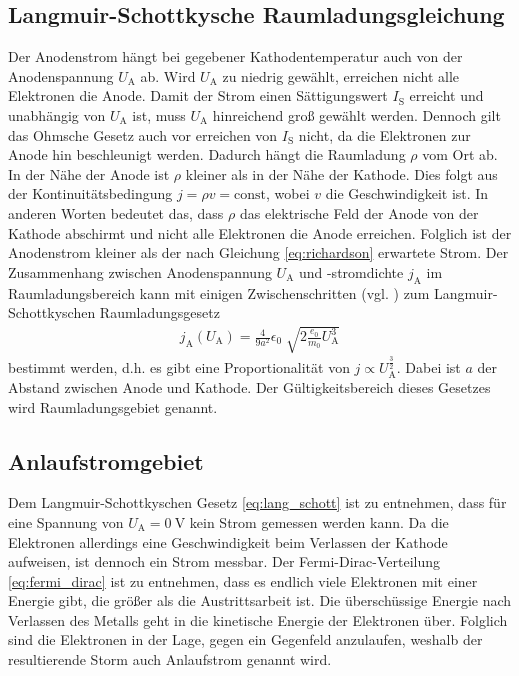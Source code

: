 \subsection{Langmuir-Schottkysche Raumladungsgleichung}
Der Anodenstrom hängt bei gegebener Kathodentemperatur auch von der Anodenspannung $U_\text{A}$ ab.
Wird $U_\text{A}$ zu niedrig gewählt, erreichen nicht alle Elektronen die Anode.
Damit der Strom einen Sättigungswert $I_\text{S}$ erreicht und unabhängig von $U_\text{A}$ ist, 
muss $U_\text{A}$ hinreichend groß gewählt werden.
Dennoch gilt das Ohmsche Gesetz auch vor erreichen von $I_\text{S}$ nicht, da die Elektronen zur Anode hin beschleunigt werden.
Dadurch hängt die Raumladung $\rho$ vom Ort ab. 
In der Nähe der Anode ist $\rho$ kleiner als in der Nähe der Kathode.
Dies folgt aus der Kontinuitätsbedingung $j = \rho v = \text{const}$, wobei $v$ die Geschwindigkeit ist.
In anderen Worten bedeutet das, dass $\rho$ das elektrische Feld der Anode von der Kathode abschirmt und nicht alle Elektronen die Anode erreichen.
Folglich ist der Anodenstrom kleiner als der nach Gleichung \eqref{eq:richardson} erwartete Strom.
Der Zusammenhang zwischen Anodenspannung $U_\text{A}$ und -stromdichte $j_\text{A}$ im Raumladungsbereich kann mit einigen Zwischenschritten
(vgl. \cite{man:v504}) zum Langmuir-Schottkyschen Raumladungsgesetz
\begin{align}
    j_\text{A}\left(U_\text{A}\right) = \frac{4}{9 a^2} \epsilon_0 \sqrt[]{2 \frac{e_0}{m_0} U_\text{A}^3}
    \label{eq:lang_schott}
\end{align}
bestimmt werden, d.h. es gibt eine Proportionalität von $j \propto U_\text{A}^\frac{3}{2}$.
Dabei ist $a$ der Abstand zwischen Anode und Kathode.
Der Gültigkeitsbereich dieses Gesetzes wird Raumladungsgebiet genannt.





\subsection{Anlaufstromgebiet}
Dem Langmuir-Schottkyschen Gesetz \eqref{eq:lang_schott} ist zu entnehmen, dass für eine Spannung von $U_\text{A} = \qty[]{0}{\volt}$ kein Strom gemessen werden kann.
Da die Elektronen allerdings eine Geschwindigkeit beim Verlassen der Kathode aufweisen, ist dennoch ein Strom messbar.
Der Fermi-Dirac-Verteilung \eqref{eq:fermi_dirac} ist zu entnehmen, dass es endlich viele Elektronen mit einer Energie gibt, 
die größer als die Austrittsarbeit ist.
Die überschüssige Energie nach Verlassen des Metalls geht in die kinetische Energie der Elektronen über.
Folglich sind die Elektronen in der Lage, gegen ein Gegenfeld anzulaufen, weshalb der resultierende Storm auch Anlaufstrom genannt wird.

